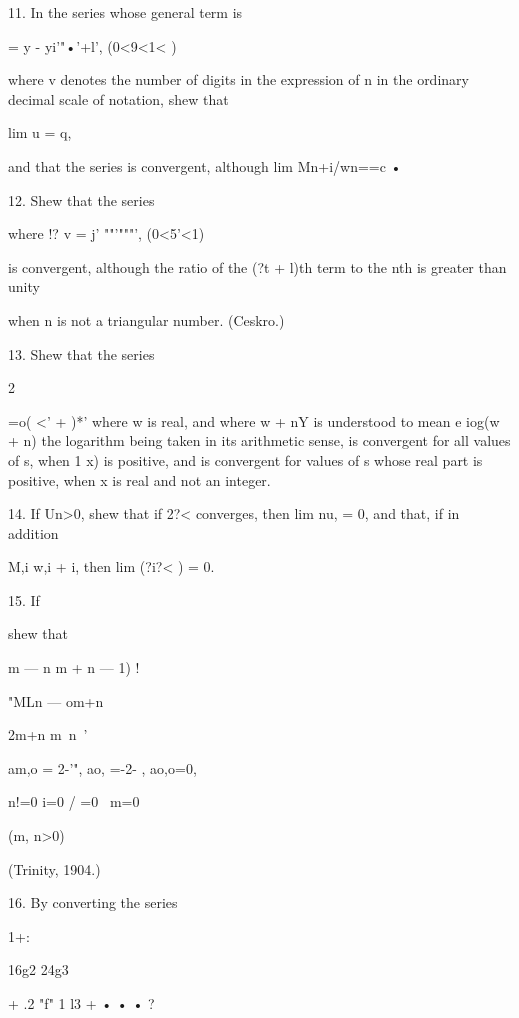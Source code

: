 11. In the series whose general term is 

   = y - yi'"•'+l', (0<9<1< ) 

where v denotes the number of digits in the expression of n in the ordinary decimal scale 
of notation, shew that 

lim u  = q, 

and that the series is convergent, although lim Mn+i/wn==c • 

12. Shew that the series 

where !? v = j' ""'"""', (0<5'<1) 

is convergent, although the ratio of the (?t + l)th term to the nth is greater than unity 

when n is not a triangular number. (Ceskro.) 

13. Shew that the series 

2 

 =o( <' +  )*' 
where w is real, and where  w + nY is understood to mean e iog(w + n)  the logarithm being 
taken in its arithmetic sense, is convergent for all values of s, when 1  x) is positive, and 
is convergent for values of s whose real part is positive, when x is real and not an integer. 

14. If Un>0, shew that if 2?<  converges, then lim  nu,  = 0, and that, if in addition 

M,i  w,i + i, then lim (?i?< ) = 0. 



15. If 

shew that 



m — n  m + n — 1) ! 



"MLn — om+n 



2m+n m\ n\ ' 

am,o = 2-'", ao, =-2- , ao,o=0, 



n!=0  i=0 /  =0 \ m=0 



(m, n>0) 



(Trinity, 1904.) 



16. By converting the series 

1+: 



16g2 24g3 

+      .2 "f" 1 l3 + • • • ? 



